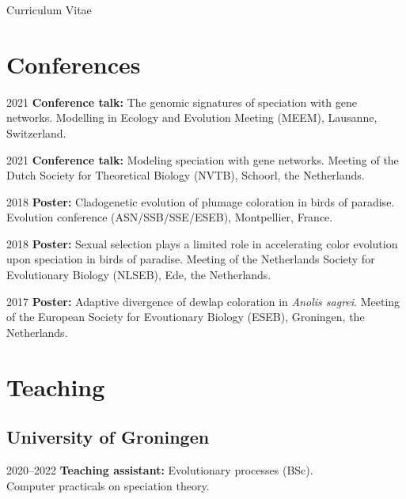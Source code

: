 \documentclass[11pt,a4paper]{article}
\begin{document}
\begin{cv}{Curriculum Vitae}
\begin{cvlist}{}
		\end{cvlist}
		
		\section{Conferences}
		
		\begin{cvlist}{}
			
			\item[2021] 
			\textbf{Conference talk:} The genomic signatures of speciation with gene networks. Modelling in Ecology and Evolution Meeting (MEEM), Lausanne, Switzerland.
			
			\item[2021] 
			\textbf{Conference talk:} Modeling speciation with gene networks. Meeting of the Dutch Society for Theoretical Biology (NVTB), Schoorl, the Netherlands.
			
			\item[2018] 
			\textbf{Poster:} Cladogenetic evolution of plumage coloration in birds of paradise. Evolution conference (ASN/SSB/SSE/ESEB), Montpellier, France.
			
			\item[2018] 
			\textbf{Poster:} Sexual selection plays a limited role in accelerating color evolution upon speciation in birds of paradise. Meeting of the Netherlands Society for Evolutionary Biology (NLSEB), Ede, the Netherlands.
			
			\item[2017] 
			\textbf{Poster:} Adaptive divergence of dewlap coloration in \textit{Anolis sagrei}. Meeting of the European Society for Evoutionary Biology (ESEB), Groningen, the Netherlands.
			
		\end{cvlist}
		
		\section{Teaching}
		
		\subsection{University of Groningen}
		
		\begin{cvlist}{}
			
			\item[2020--2022] \textbf{Teaching assistant:} Evolutionary processes (BSc).\\
			Computer practicals on speciation theory. 
			

\end{cvlist}
\end{cv}
\end{document}
